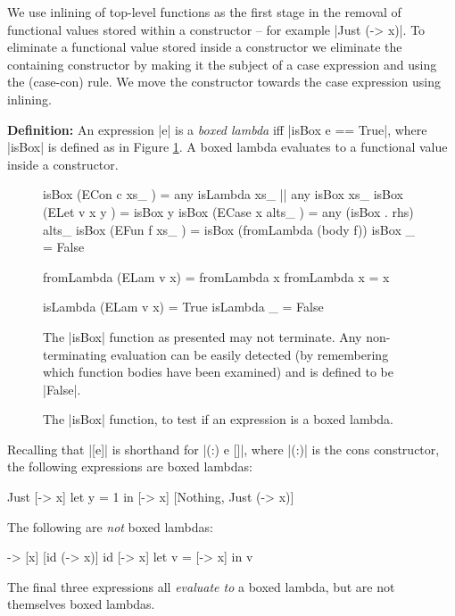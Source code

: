 \documentclass[preprint]{sigplanconf}
\newenvironment{definition}
    {\smallskip
     \noindent\textbf{Definition:}}
    {\noexample}
\begin{document}
We use inlining of top-level functions as the first stage in the removal of functional values stored within a constructor -- for example |Just (\x -> x)|. To eliminate a functional value stored inside a constructor we eliminate the containing constructor by making it the subject of a case expression and using the (case-con) rule. We move the constructor towards the case expression using inlining.

\begin{definition}
An expression |e| is a \textit{boxed lambda} iff |isBox e == True|, where |isBox| is defined as in Figure \ref{fig:boxed_lambda}. A boxed lambda evaluates to a functional value inside a constructor.
\end{definition}

\begin{figure}
\begin{code}
isBox (ECon c xs_     )  =  any isLambda xs_ ||  any isBox xs_
isBox (ELet v x y     )  =  isBox y
isBox (ECase x alts_  )  =  any (isBox . rhs) alts_
isBox (EFun f xs_     )  =  isBox (fromLambda (body f))
isBox _                  =  False

fromLambda (ELam v x)    = fromLambda x
fromLambda x             = x

isLambda (ELam v x)      = True
isLambda _               = False
\end{code}

The |isBox| function as presented may not terminate. Any non-terminating evaluation can be easily detected (by remembering which function bodies have been examined) and is defined to be |False|.
\caption{The |isBox| function, to test if an expression is a boxed lambda.}
\label{fig:boxed_lambda}
\end{figure}

\begin{example}
Recalling that |[e]| is shorthand for |(:) e []|, where |(:)| is the cons constructor, the following expressions are boxed lambdas:

\ignore\begin{code}
[\x -> x]
Just [\x -> x]
let y = 1 in [\x -> x]
[Nothing, Just (\x -> x)]
\end{code}

\noindent The following are \textit{not} boxed lambdas:

\ignore\begin{code}
\x -> [x]
[id (\x -> x)]
id [\x -> x]
let v = [\x -> x] in v
\end{code}

The final three expressions all \textit{evaluate to} a boxed lambda, but are not themselves boxed lambdas.
\end{example}
 
\end{document}

